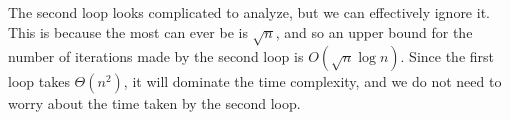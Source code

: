 \begin{prob}
    \timecomplexityinstructions

    \inputminted{python}{\thisdir/code.py}


    \begin{soln}
        The second loop looks complicated to analyze, but we can effectively
        ignore it. This is because the most  can ever be is $\sqrt
        n$, and so an upper bound for the number of iterations made by the
        second loop is $O(\sqrt n \log n)$. Since the first loop takes
        $\Theta(n^2)$, it will dominate the time complexity, and we do not need
        to worry about the time taken by the second loop.
    \end{soln}

\end{prob}
